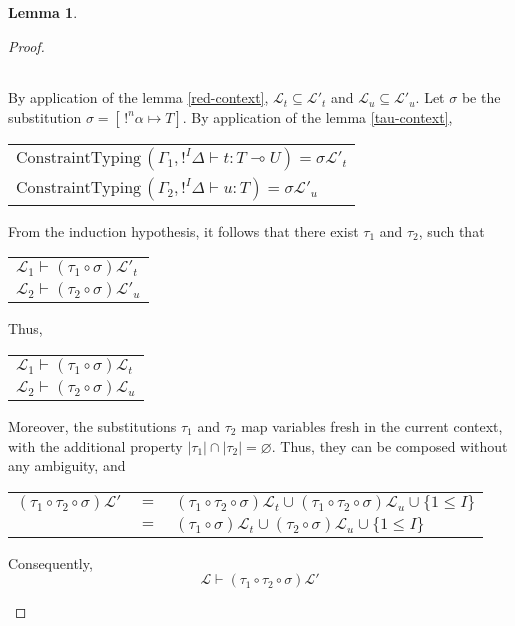 \documentclass[9pt]{article}
\theoremstyle{plain}
\theoremstyle{definition}
\newtheorem{lemma}{Lemma}[section]
\begin{document}
\begin{lemma}
\begin{proof}
\begin{itemize}
\begin{center}
\begin{tabular}{l}
			 		\end{tabular}
			 		\end{center}
			 	By application of the lemma \ref{red-context}, $\mathcal{L}_t \subseteq \mathcal{L'}_t$ and $\mathcal{L}_u \subseteq \mathcal{L'}_u$.
			 	Let $\sigma$ be the substitution $\sigma = [\, !^n\alpha \mapsto T]$. By application of the lemma \ref{tau-context}, 
			 		\begin{center}
			 		\begin{tabular}{l}
			 			$\text{ConstraintTyping} \, (\Gamma_1, !^I \Delta \vdash t : T \multimap U) = \sigma \mathcal{L'}_t$ \\
			 			$\text{ConstraintTyping} \, (\Gamma_2, !^I \Delta \vdash u : T) = \sigma \mathcal{L'}_u$
			 		\end{tabular}
			 		\end{center}
			 	From the induction hypothesis, it follows that there exist $\tau_1$ and $\tau_2$, such that
			 		\begin{center}
			 		\begin{tabular}{l}
			 			$\mathcal{L}_1 \vdash (\tau_1 \circ \sigma) \mathcal{L'}_t$ \\
			 			$\mathcal{L}_2 \vdash (\tau_2 \circ \sigma) \mathcal{L'}_u$
			 		\end{tabular}
			 		\end{center}
			 	Thus,
			 		\begin{center}
			 		\begin{tabular}{l}
			 			$\mathcal{L}_1 \vdash (\tau_1 \circ \sigma) \mathcal{L}_t$ \\
			 			$\mathcal{L}_2 \vdash (\tau_2 \circ \sigma) \mathcal{L}_u$
			 		\end{tabular}
			 		\end{center}
			 	Moreover, the substitutions $\tau_1$ and $\tau_2$ map variables fresh in the current context, with the
			 	additional property $|\tau_1| \cap |\tau_2| = \varnothing$. Thus, they can be composed without any ambiguity, and
			 		\begin{center}
			 		\begin{tabular}{lcl}
			 			$(\tau_1 \circ \tau_2 \circ \sigma) \mathcal{L'}$ & $=$ & 
				 			$(\tau_1 \circ \tau_2 \circ \sigma) \mathcal{L}_t \cup (\tau_1 \circ \tau_2 \circ \sigma) \mathcal{L}_u \cup \{1 \le I\}$ \\
				 		& $=$ & $(\tau_1 \circ \sigma) \mathcal{L}_t \cup (\tau_2 \circ \sigma) \mathcal{L}_u \cup \{1 \le I\}$
			 		\end{tabular}
			 		\end{center}
			 	Consequently,
			 		$$ \mathcal{L} \vdash (\tau_1 \circ \tau_2 \circ \sigma) \mathcal{L'} $$
			 		

\end{itemize}
\end{proof}
\end{lemma}
\end{document}
